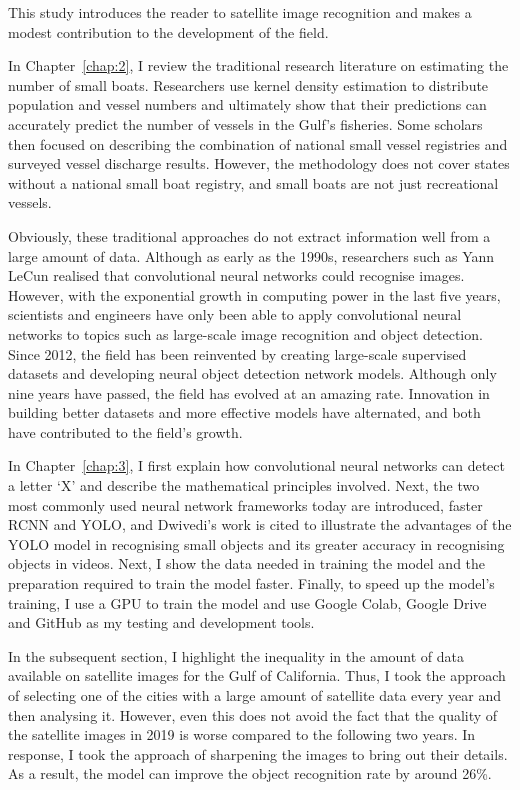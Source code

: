 
This study introduces the reader to satellite image recognition and makes a modest contribution to the development of the field.

In Chapter~\ref{chap:2}, I review the traditional research literature on estimating the number of small boats. Researchers use kernel density estimation to distribute population and vessel numbers and ultimately show that their predictions can accurately predict the number of vessels in the Gulf's fisheries. Some scholars then focused on describing the combination of national small vessel registries and surveyed vessel discharge results. However, the methodology does not cover states without a national small boat registry, and small boats are not just recreational vessels.

Obviously, these traditional approaches do not extract information well from a large amount of data. Although as early as the 1990s, researchers such as Yann LeCun realised that convolutional neural networks could recognise images. However, with the exponential growth in computing power in the last five years, scientists and engineers have only been able to apply convolutional neural networks to topics such as large-scale image recognition and object detection. Since 2012, the field has been reinvented by creating large-scale supervised datasets and developing neural object detection network models. Although only nine years have passed, the field has evolved at an amazing rate. Innovation in building better datasets and more effective models have alternated, and both have contributed to the field's growth.

In Chapter~\ref{chap:3}, I first explain how convolutional neural networks can detect a letter `X' and describe the mathematical principles involved. Next, the two most commonly used neural network frameworks today are introduced, faster RCNN and YOLO, and Dwivedi's work is cited to illustrate the advantages of the YOLO model in recognising small objects and its greater accuracy in recognising objects in videos. Next, I show the data needed in training the model and the preparation required to train the model faster. Finally, to speed up the model's training, I use a GPU to train the model and use Google Colab, Google Drive and GitHub as my testing and development tools.


In the subsequent section, I highlight the inequality in the amount of data available on satellite images for the Gulf of California. Thus, I took the approach of selecting one of the cities with a large amount of satellite data every year and then analysing it. However, even this does not avoid the fact that the quality of the satellite images in 2019 is worse compared to the following two years. In response, I took the approach of sharpening the images to bring out their details. As a result, the model can improve the object recognition rate by around 26\%.

